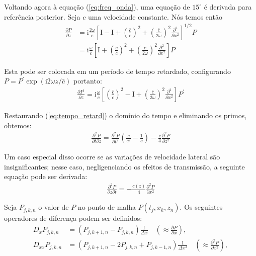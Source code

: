 Voltando agora à equação (\ref{eq:freq_onda}), uma equação de $15^{\circ}$ é derivada para referência posterior. Seja $c$ uma velocidade constante. Nós temos então
\begin{align}\nonumber
\frac{\partial P}{\partial z}&=\mathrm{i} \frac{2 \omega}{c}\left[\mathrm{I}-\mathrm{I}+\left(\frac{\bar{c}}{c}\right)^{2}+\left(\frac{\bar{c}}{2 \omega}\right)^{2} \frac{\partial^{2}}{\partial x^{2}}\right]^{1 / 2} P\\
\label{eq:velocidade_const}&=\mathrm{i}\frac{\omega}{\bar{c}}\left[\mathrm{I}+\left(\frac{\bar{c}}{c}\right)^{2}+\left(\frac{\bar{c}}{2 \omega}\right)^{2} \frac{\partial^{2}}{\partial x^{2}}\right] P
\end{align}

Esta pode ser colocada em um período de tempo retardado, configurando $P=P^{\prime} \exp (\mathrm{i} 2 \omega z / \bar{c})$ portanto:
\begin{align}
\frac{\partial P^{\prime}}{\partial z}=\mathrm{i} \frac{\omega}{\bar{c}}\left[\left(\frac{\bar{c}}{c}\right)^{2}-\mathrm{I}+\left(\frac{\bar{c}}{2 \omega}\right)^{2} \frac{\partial^{2}}{\partial x^{2}}\right] P^{\prime}
\label{eq:tempo_retard}
\end{align}

Restaurando (\ref{eq:tempo_retard}) o domínio do tempo e eliminando os primos, obtemos:
\begin{align}
\frac{\partial^{2} P}{\partial t \partial z}=\frac{\partial^{2} P}{\partial t^{2}}\left(\frac{\bar{c}}{c^{2}}-\frac{1}{\bar{c}}\right)-\frac{\bar{c}}{4} \frac{\partial^{2} P}{\partial z^{2}}
\label{eq:sem_primo}
\end{align}

Um caso especial disso ocorre se as variações de velocidade lateral são insignificantes; nesse caso, negligenciando os efeitos de transmissão, a seguinte equação pode ser derivada:
\begin{align}
\frac{\partial^{2} P}{\partial z \partial t}=-\frac{c(z)}{4} \frac{\partial^{2} P}{\partial x^{2}}
\label{eq:desprez_termos}
\end{align}

Seja $P_{j, k, n}$ o valor de $P$ no ponto de malha $P(t_j, x_k, z_n)$. Os seguintes operadores de diferença podem ser definidos:
\begin{align*}
D_{x} P_{j, k, n}&=\left(P_{j, k+1, n}-P_{j, k, n}\right) \frac{\mathrm{I}}{\Delta x} \quad \left(\approx \frac{\partial P}{\partial x}\right),\\
D_{x x} P_{j, k, n}&=\left(P_{j, k+1, n}-2 P_{j, k, n}+P_{j, k-1, n}\right) \frac{\mathrm{I}}{\Delta x^{2}} \quad \left(\approx \frac{\partial^{2} P}{\partial x^{2}}\right),
\end{align*}


